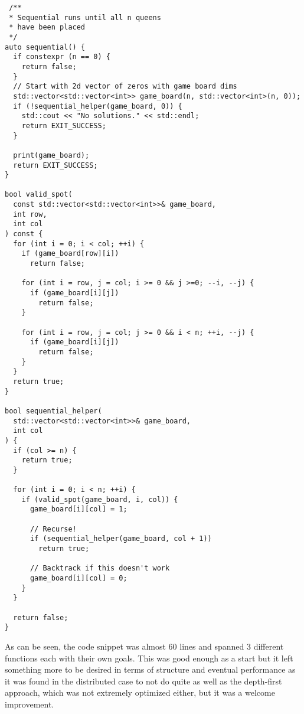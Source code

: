 \documentclass[11pt]{article}
\begin{document}
\lstset{frame=tb,language=c++}
\begin{lstlisting}
 /**
 * Sequential runs until all n queens
 * have been placed
 */
auto sequential() {
  if constexpr (n == 0) {
    return false;
  }
  // Start with 2d vector of zeros with game board dims
  std::vector<std::vector<int>> game_board(n, std::vector<int>(n, 0));
  if (!sequential_helper(game_board, 0)) {
    std::cout << "No solutions." << std::endl;
    return EXIT_SUCCESS;
  }

  print(game_board);
  return EXIT_SUCCESS;
}

bool valid_spot(
  const std::vector<std::vector<int>>& game_board,
  int row,
  int col
) const {
  for (int i = 0; i < col; ++i) {
    if (game_board[row][i])
      return false;

    for (int i = row, j = col; i >= 0 && j >=0; --i, --j) {
      if (game_board[i][j])
        return false;
    }

    for (int i = row, j = col; j >= 0 && i < n; ++i, --j) {
      if (game_board[i][j])
        return false;
    }
  }
  return true;
}

bool sequential_helper(
  std::vector<std::vector<int>>& game_board,
  int col
) {
  if (col >= n) {
    return true;
  }

  for (int i = 0; i < n; ++i) {
    if (valid_spot(game_board, i, col)) {
      game_board[i][col] = 1;

      // Recurse!
      if (sequential_helper(game_board, col + 1))
        return true;

      // Backtrack if this doesn't work
      game_board[i][col] = 0;
    }
  }

  return false;
}
\end{lstlisting}
As can be seen, the code snippet was almost 60 lines and spanned 3 different functions each with their own goals. This was good enough as a start but it left something more to be desired in terms of structure and eventual performance as it was found in the distributed case to not do quite as well as the depth-first approach, which was not extremely optimized either, but it was a welcome improvement.
\end{document}
